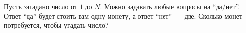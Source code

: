 Пусть загадано число от $1$ до $N$. Можно задавать любые вопросы на ``да/нет''. Ответ ``да'' будет стоить
вам одну монету, а ответ ``нет''~--- две. Сколько монет потребуется, чтобы угадать число?
